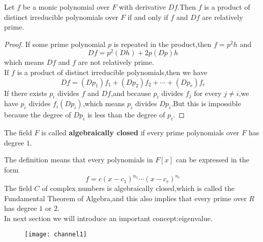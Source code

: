 \documentclass{article}
\begin{document}
\begin{thm}
	Let $f$ be a monic polynomial over $F$ with derivative $Df$.Then $f$ is a product of distinct irreducible polynomials over $F$ if and only if $f$ and $Df$ are relatively prime. 
\end{thm}
\begin{proof}
	If some prime polynomial $p$ is repeated in the product,then $f=p^2h$ and 
	\[Df=p^2(Dh)+2p(Dp)h\]
	which means $Df$ and $f$ are not relatively prime.\\
	If $f$ is a product of distinct irreducible polynomials,then we have
	\[Df=(Dp_1)f_1+(Dp_2)f_2+\cdots+(Dp_r)f_r\]
	If there exists $p_i$ divides $f$ and $Df$,and because $p_i$ divides $f_j$ for every $j\neq i$,we have $p_i$ divides $f_i(Dp_i)$,which means $p_i$ divides $Dp_i$.But this is impossible because the degree of $Dp_i$ is less than the degree of $p_i$.
\end{proof}
\begin{dde}
	The field $F$ is called \textbf{algebraically closed} if every prime polynomials over $F$ has degree $1$.
\end{dde}
The definition means that every polynomials in $F[x]$ can be expressed in the form
\[f=c(x-c_1)^{n_1}\cdots(x-c_r)^{n_r}\]
The field $C$ of complex numbers is algebraically closed,which is called the Fundamental Theorem of Algebra,and this also implies that every prime over $R$ has degree $1$ or $2$.\\
\indent In next section we will introduce an important concept:eigenvalue.
\begin{figure}[htbp]
	\centering
	\texttt{[image: channel1]}
\end{figure}
\end{document}
